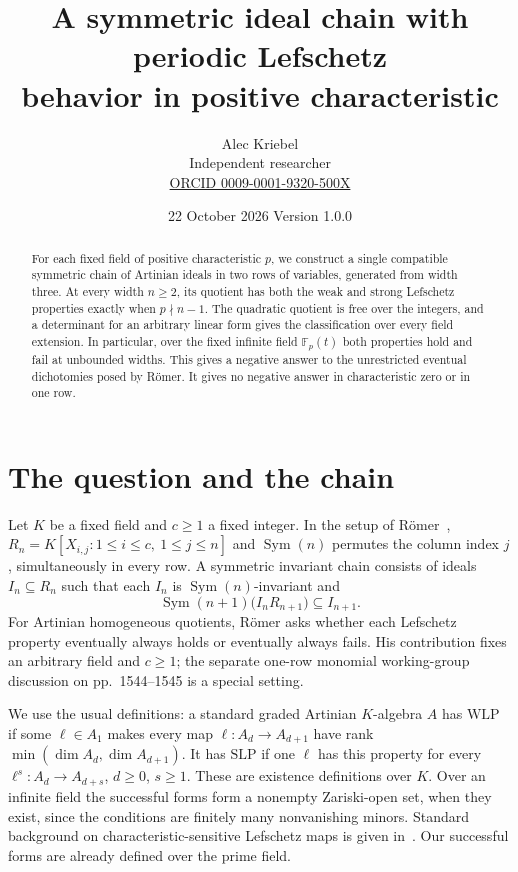 \documentclass[11pt]{article}
\title{A symmetric ideal chain with periodic Lefschetz\\ behavior in positive characteristic}
\author{Alec Kriebel\\ \small Independent researcher\\
\small \href{https://orcid.org/0009-0001-9320-500X}{ORCID 0009-0001-9320-500X}}
\date{22 October 2026 \quad Version 1.0.0}
\theoremstyle{definition}
\newcommand{\Sym}{\operatorname{Sym}}
\newcommand{\WLP}{\mathrm{WLP}}
\newcommand{\SLP}{\mathrm{SLP}}
\begin{document}
\maketitle
\begin{abstract}
For each fixed field of positive characteristic $p$, we construct a single
compatible symmetric chain of Artinian ideals in two rows of variables, generated
from width three. At every width $n\geq2$, its quotient has both the weak and
strong Lefschetz properties exactly when $p\nmid n-1$. The quadratic quotient is
free over the integers, and a determinant for an arbitrary linear form gives the
classification over every field extension. In particular, over the fixed infinite
field $\mathbb F_p(t)$ both properties hold and fail at unbounded widths.
This gives a negative answer to the unrestricted eventual dichotomies posed by
R\"omer. It gives no negative answer in characteristic zero or in one row.
\end{abstract}

\section{The question and the chain}
Let $K$ be a fixed field and $c\geq1$ a fixed integer. In the setup of
R\"omer~\cite[pp.~1594--1596]{romer},
$R_n=K[X_{i,j}:1\leq i\leq c,\ 1\leq j\leq n]$ and $\Sym(n)$
permutes the column index $j$, simultaneously in every row.
A symmetric invariant chain consists of ideals $I_n\subseteq R_n$ such that
each $I_n$ is $\Sym(n)$-invariant and
\[
 \Sym(n+1)\bigl(I_nR_{n+1}\bigr)\subseteq I_{n+1}.
\]
For Artinian homogeneous quotients, R\"omer asks whether each Lefschetz property
eventually always holds or eventually always fails. His contribution fixes an
arbitrary field and $c\geq1$; the separate one-row monomial working-group
discussion on pp.~1544--1545 is a special setting.

We use the usual definitions: a standard graded Artinian $K$-algebra $A$
has $\WLP$ if some $\ell\in A_1$ makes every map
$\ell:A_d\to A_{d+1}$ have rank $\min(\dim A_d,\dim A_{d+1})$.
It has $\SLP$ if one $\ell$ has this property for every
$\ell^s:A_d\to A_{d+s}$, $d\geq0$, $s\geq1$.
These are existence definitions over $K$. Over an infinite field the
successful forms form a nonempty Zariski-open set, when they exist,
since the conditions are finitely many nonvanishing minors. Standard
background on characteristic-sensitive Lefschetz maps is given in~\cite{cook}.
Our successful forms are already defined over the prime field.
\end{document}

